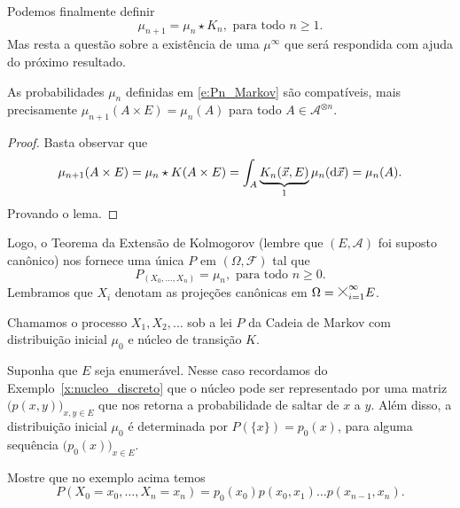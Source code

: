 \begin{topics}
Podemos finalmente definir
\begin{equation}
  \label{e:Pn_Markov}
  \mu_{n+1} = \mu_n \star K_n, \text{ para todo $n \geq 1$}.
\end{equation}
Mas resta a questão sobre a existência de uma $\mu^\infty$ que será respondida com ajuda do próximo resultado.

\begin{lemma}
  As probabilidades $\mu_n$ definidas em \eqref{e:Pn_Markov} são compatíveis, mais precisamente $\mu_{n+1}(A \times E) = \mu_n(A)$ para todo $A \in \mathcal{A}^{\otimes n}$.
\end{lemma}

\begin{proof}
  Basta observar que
  \begin{equation}
    \mu_{n+1}(A \times E) = \mu_n \star K (A \times E) = \int_{A} \underbrace{K_n (\vec{x}, E)}_1 \mu_n(\mathop{}\!\mathrm{d} \vec{x}) = \mu_n(A).
  \end{equation}
  Provando o lema.
\end{proof}

Logo, o Teorema da Extensão de Kolmogorov (lembre que $(E, \mathcal{A})$ foi suposto canônico) nos fornece uma única $P$ em $(\Omega, \mathcal{F})$ tal que
\begin{equation}
   P_{(X_0, \dots, X_n)} = \mu_n, \text{ para todo $n \geq 0$}.
\end{equation}
Lembramos que $X_i$ denotam as projeções canônicas em $\Omega = \mtimes_{i=1}^\infty E$.

Chamamos o processo $X_1, X_2, \dots$ sob a lei $P$ da Cadeia de Markov  com distribuição inicial $\mu_0$ e núcleo de transição $K$.

\begin{example}
  \label{x:Markov_p_xy}
  Suponha que $E$ seja enumerável.
  Nesse caso recordamos do Exemplo~\ref{x:nucleo_discreto} que o núcleo pode ser representado por uma matriz $\big(p(x,y)\big)_{x,y \in E}$ que nos retorna a probabilidade de saltar de $x$ a $y$.
  Além disso, a distribuição inicial $\mu_0$ é determinada por $P(\{x\}) = p_0(x)$, para alguma sequência $\big(p_0(x)\big)_{x \in E}$.
\end{example}

\begin{exercise}
  Mostre que no exemplo acima temos
  \begin{equation}
    P(X_0 = x_0, \dots, X_n = x_n) = p_0(x_0) p(x_0, x_1) \dots p(x_{n-1}, x_n).
  \end{equation}
\end{exercise}


\end{topics}

